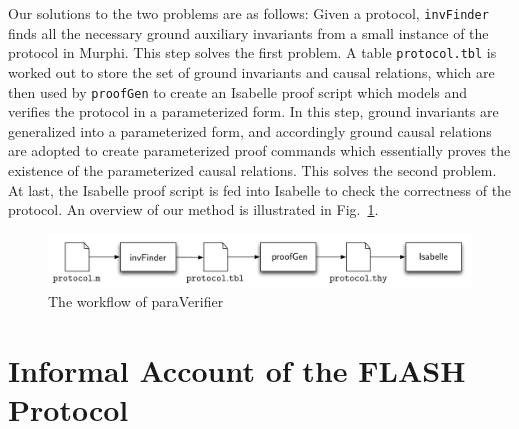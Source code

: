 \documentclass{llncs-new}
\begin{document}
Our solutions to the two problems are as follows:
Given a protocol,  \texttt{invFinder} finds all the necessary ground auxiliary invariants from a small instance of the protocol in Murphi. This step solves the first  problem.
 A table {\tt protocol.tbl} is worked out  to store the set of ground invariants and
 causal relations, which are then  used by {\tt proofGen} to
create an Isabelle proof   script which models and verifies the
protocol in a parameterized form. In this step, ground invariants
are generalized into a parameterized form, and accordingly
ground causal relations are adopted to create parameterized
proof commands which essentially proves the existence of the
parameterized causal relations. This solves the second problem.  At last, the Isabelle proof script is
fed into Isabelle to check the correctness of the protocol.
An overview of our method is  illustrated in Fig.~\ref{fig:archParaVerifier}.

\begin{figure}[htbp]
\centering %
\includegraphics[width=1\textwidth]{paraVerifier.pdf}
\vspace{-20pt}
\caption{The workflow of {\sf paraVerifier} \label{fig:archParaVerifier}
}
\end{figure}
\vspace{-20pt}

\section{Informal Account of the FLASH Protocol\label{sec:informalOfFLASH}}
\vspace{-5pt}
\end{document}
